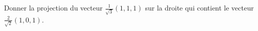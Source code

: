 
\begin{exercice}\label{exoOutilsMath-0017}

	Donner la projection du vecteur $\frac{1}{ \sqrt{3} }(1,1,1)$ sur la droite qui contient le vecteur $\frac{ 2 }{ \sqrt{2} }(1,0,1)$.

\end{exercice}
